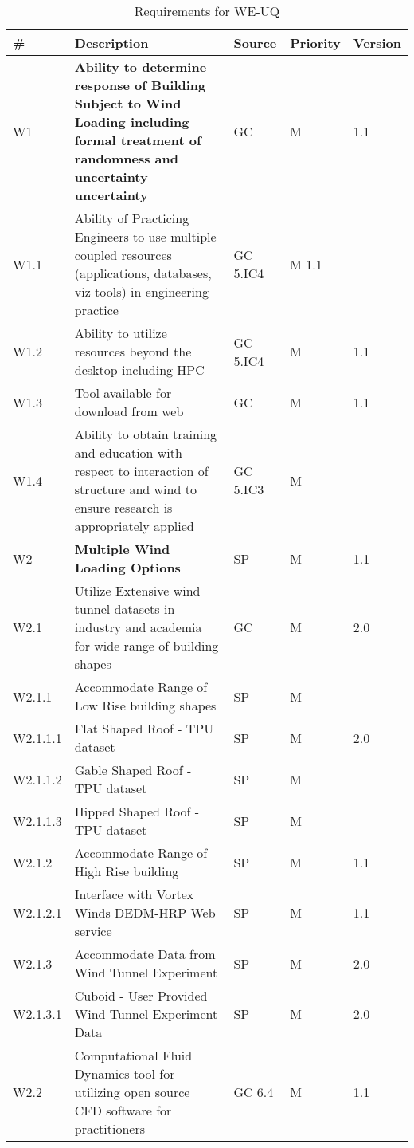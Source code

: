 \begin{longtable}{| p{} | p{} | p{} | p{} |  p{} |}

\caption{Requirements for WE-UQ}
  \label{tab:featureRequirements}  
    \\
   \hline
\rowcolor{lightgray}
\# & Description & Source & Priority & Version \\ \hline

W1 & \textbf{Ability to determine response of Building Subject to Wind Loading including formal treatment of randomness and uncertainty uncertainty} & GC & M & 1.1  \\ \hline
W1.1 & Ability of Practicing Engineers to use multiple coupled resources (applications, databases, viz tools) in engineering practice & GC 5.IC4 & M 1.1 & \\ \hline
W1.2 & Ability to utilize resources beyond the desktop including HPC & GC 5.IC4 & M & 1.1 \\ \hline
W1.3 & Tool available for download from web & GC & M & 1.1 \\ \hline
W1.4 & Ability to obtain training and education with respect to interaction of structure and wind to ensure research is appropriately applied  & GC 5.IC3 & M & \\ \hhline{=====}
W2 & \textbf{Multiple Wind Loading Options } & SP & M & 1.1 \\ \hline
W2.1 & Utilize Extensive wind tunnel datasets in industry and academia for wide range of building shapes & GC & M & 2.0 \\ \hline
W2.1.1 & Accommodate Range of Low Rise building shapes & SP & M &  \\ \hline
W2.1.1.1 & Flat Shaped Roof - TPU dataset & SP & M & 2.0 \\ \hline
W2.1.1.2 & Gable Shaped Roof - TPU dataset & SP & M & \\ \hline
W2.1.1.3 & Hipped Shaped Roof - TPU dataset & SP & M & \\ \hline
W2.1.2 & Accommodate Range of High Rise building  & SP & M & 1.1 \\ \hline
W2.1.2.1 & Interface with Vortex Winds DEDM-HRP Web service & SP & M & 1.1 \\ \hline
W2.1.3 & Accommodate Data from Wind Tunnel Experiment & SP & M & 2.0 \\ \hline
W2.1.3.1 & Cuboid - User Provided Wind Tunnel Experiment Data  & SP & M & 2.0 \\ \hline
W2.2 & Computational Fluid Dynamics tool for utilizing open source CFD software for practitioners & GC 6.4 & M & 1.1 \\ \hline

\end{longtable}
